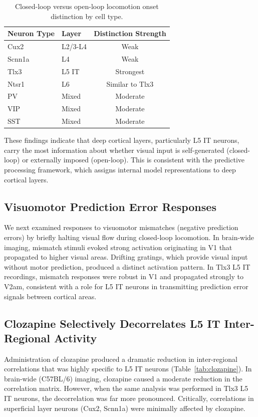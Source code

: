 \documentclass[11pt]{article}
\begin{document}
\begin{table}[h]
\centering
\caption{Closed-loop versus open-loop locomotion onset distinction by cell type.}
\label{tab:closedopen}
\begin{tabular}{llc}
\toprule
Neuron Type & Layer & Distinction Strength \\
\midrule
Cux2 & L2/3-L4 & Weak \\
Scnn1a & L4 & Weak \\
Tlx3 & L5 IT & Strongest \\
Ntsr1 & L6 & Similar to Tlx3 \\
PV & Mixed & Moderate \\
VIP & Mixed & Moderate \\
SST & Mixed & Moderate \\
\bottomrule
\end{tabular}
\end{table}

These findings indicate that deep cortical layers, particularly L5 IT neurons, carry the most information about whether visual input is self-generated (closed-loop) or externally imposed (open-loop). This is consistent with the predictive processing framework, which assigns internal model representations to deep cortical layers.

\subsection{Visuomotor Prediction Error Responses}

We next examined responses to visuomotor mismatches (negative prediction errors) by briefly halting visual flow during closed-loop locomotion. In brain-wide imaging, mismatch stimuli evoked strong activation originating in V1 that propagated to higher visual areas. Drifting gratings, which provide visual input without motor prediction, produced a distinct activation pattern. In Tlx3 L5 IT recordings, mismatch responses were robust in V1 and propagated strongly to V2am, consistent with a role for L5 IT neurons in transmitting prediction error signals between cortical areas.

\subsection{Clozapine Selectively Decorrelates L5 IT Inter-Regional Activity}

Administration of clozapine produced a dramatic reduction in inter-regional correlations that was highly specific to L5 IT neurons (Table~\ref{tab:clozapine}). In brain-wide (C57BL/6) imaging, clozapine caused a moderate reduction in the correlation matrix. However, when the same analysis was performed in Tlx3 L5 IT neurons, the decorrelation was far more pronounced. Critically, correlations in superficial layer neurons (Cux2, Scnn1a) were minimally affected by clozapine.
\end{document}
